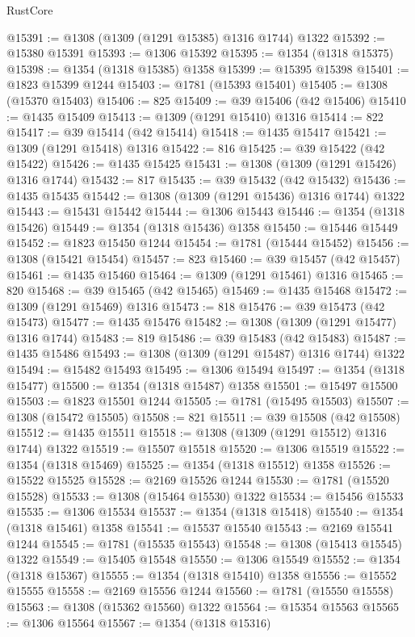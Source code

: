 \begin{lexlean}{RustCore}
\begin{coremodule}
@15391 := @1308 (@1309 (@1291 @15385) @1316 @1744) @1322
@15392 := @15380 @15391
@15393 := @1306 @15392
@15395 := @1354 (@1318 @15375)
@15398 := @1354 (@1318 @15385) @1358
@15399 := @15395 @15398
@15401 := @1823 @15399 @1244
@15403 := @1781 (@15393 @15401)
@15405 := @1308 (@15370 @15403)
@15406 := 825
@15409 := @39 @15406 (@42 @15406)
@15410 := @1435 @15409
@15413 := @1309 (@1291 @15410) @1316
@15414 := 822
@15417 := @39 @15414 (@42 @15414)
@15418 := @1435 @15417
@15421 := @1309 (@1291 @15418) @1316
@15422 := 816
@15425 := @39 @15422 (@42 @15422)
@15426 := @1435 @15425
@15431 := @1308 (@1309 (@1291 @15426) @1316 @1744)
@15432 := 817
@15435 := @39 @15432 (@42 @15432)
@15436 := @1435 @15435
@15442 := @1308 (@1309 (@1291 @15436) @1316 @1744) @1322
@15443 := @15431 @15442
@15444 := @1306 @15443
@15446 := @1354 (@1318 @15426)
@15449 := @1354 (@1318 @15436) @1358
@15450 := @15446 @15449
@15452 := @1823 @15450 @1244
@15454 := @1781 (@15444 @15452)
@15456 := @1308 (@15421 @15454)
@15457 := 823
@15460 := @39 @15457 (@42 @15457)
@15461 := @1435 @15460
@15464 := @1309 (@1291 @15461) @1316
@15465 := 820
@15468 := @39 @15465 (@42 @15465)
@15469 := @1435 @15468
@15472 := @1309 (@1291 @15469) @1316
@15473 := 818
@15476 := @39 @15473 (@42 @15473)
@15477 := @1435 @15476
@15482 := @1308 (@1309 (@1291 @15477) @1316 @1744)
@15483 := 819
@15486 := @39 @15483 (@42 @15483)
@15487 := @1435 @15486
@15493 := @1308 (@1309 (@1291 @15487) @1316 @1744) @1322
@15494 := @15482 @15493
@15495 := @1306 @15494
@15497 := @1354 (@1318 @15477)
@15500 := @1354 (@1318 @15487) @1358
@15501 := @15497 @15500
@15503 := @1823 @15501 @1244
@15505 := @1781 (@15495 @15503)
@15507 := @1308 (@15472 @15505)
@15508 := 821
@15511 := @39 @15508 (@42 @15508)
@15512 := @1435 @15511
@15518 := @1308 (@1309 (@1291 @15512) @1316 @1744) @1322
@15519 := @15507 @15518
@15520 := @1306 @15519
@15522 := @1354 (@1318 @15469)
@15525 := @1354 (@1318 @15512) @1358
@15526 := @15522 @15525
@15528 := @2169 @15526 @1244
@15530 := @1781 (@15520 @15528)
@15533 := @1308 (@15464 @15530) @1322
@15534 := @15456 @15533
@15535 := @1306 @15534
@15537 := @1354 (@1318 @15418)
@15540 := @1354 (@1318 @15461) @1358
@15541 := @15537 @15540
@15543 := @2169 @15541 @1244
@15545 := @1781 (@15535 @15543)
@15548 := @1308 (@15413 @15545) @1322
@15549 := @15405 @15548
@15550 := @1306 @15549
@15552 := @1354 (@1318 @15367)
@15555 := @1354 (@1318 @15410) @1358
@15556 := @15552 @15555
@15558 := @2169 @15556 @1244
@15560 := @1781 (@15550 @15558)
@15563 := @1308 (@15362 @15560) @1322
@15564 := @15354 @15563
@15565 := @1306 @15564
@15567 := @1354 (@1318 @15316)

\end{coremodule}
\end{lexlean}
